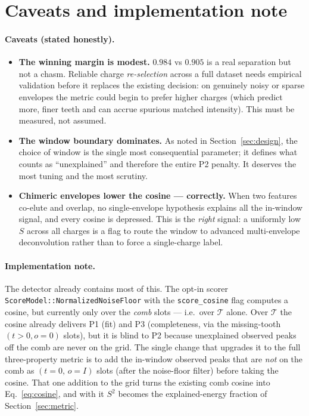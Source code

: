 \documentclass[11pt]{article}
\begin{document}
\section{Caveats and implementation note}
\label{sec:caveats}

\paragraph{Caveats (stated honestly).}
\begin{itemize}[leftmargin=1.4em]
  \item \textbf{The winning margin is modest.} $0.984$ vs $0.905$ is a real
  separation but not a chasm. Reliable charge \emph{re-selection} across a full
  dataset needs empirical validation before it replaces the existing decision: on
  genuinely noisy or sparse envelopes the metric could begin to prefer higher
  charges (which predict more, finer teeth and can accrue spurious matched
  intensity). This must be measured, not assumed.
  \item \textbf{The window boundary dominates.} As noted in
  Section~\ref{sec:design}, the choice of window is the single most consequential
  parameter; it defines what counts as ``unexplained'' and therefore the entire P2
  penalty. It deserves the most tuning and the most scrutiny.
  \item \textbf{Chimeric envelopes lower the cosine --- correctly.} When two
  features co-elute and overlap, no single-envelope hypothesis explains all the
  in-window signal, and every cosine is depressed. This is the \emph{right} signal:
  a uniformly low $S$ across all charges is a flag to route the window to advanced
  multi-envelope deconvolution rather than to force a single-charge label.
\end{itemize}

\paragraph{Implementation note.}
The detector already contains most of this. The opt-in scorer
\texttt{ScoreModel::NormalizedNoiseFloor} with the \texttt{score\_cosine} flag
computes a cosine, but currently only over the \emph{comb} slots --- i.e.\ over
$\mathcal{T}$ alone. Over $\mathcal{T}$ the cosine already delivers P1 (fit) and P3
(completeness, via the missing-tooth $(t{>}0,o{=}0)$ slots), but it is blind to P2
because unexplained observed peaks off the comb are never on the grid. The single
change that upgrades it to the full three-property metric is to add the in-window
observed peaks that are \emph{not} on the comb as $(t=0,\,o=I)$ slots (after the
noise-floor filter) before taking the cosine. That one addition to the grid turns the
existing comb cosine into Eq.~\eqref{eq:cosine}, and with it $S^2$ becomes the
explained-energy fraction of Section~\ref{sec:metric}.
\end{document}
